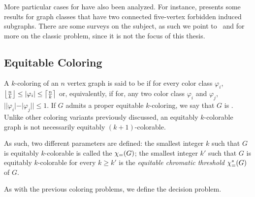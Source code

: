 More particular cases for  have also been analyzed. For instance, \citep{coloring_art} presents some results for graph classes that have two connected five-vertex forbidden induced subgraphs. There are some surveys on the subject, as such we point to~\citep{coloring_survey} and \citep{coloring_survey2} for more on the classic  problem, since it is not the focus of this thesis.


\subsection{Equitable Coloring}
A $k$-coloring of an $n$ vertex graph is said to be  if for every color class $\varphi_i$, $\left\lfloor\frac{n}{k}\right\rfloor \leq |\varphi_i| \leq \left\lceil\frac{n}{k}\right\rceil$ or, equivalently, if for, any two color class $\varphi_i$ and $\varphi_j$, $||\varphi_i| - |\varphi_j|| \leq 1$.
If $G$ admits a proper equitable $k$-coloring, we say that $G$ is .
Unlike other coloring variants previously discussed, an equitably $k$-colorable graph is not necessarily equitably $(k+1)$-colorable.

As such, two different parameters are defined: the smallest integer $k$ such that $G$ is equitably $k$-colorable is called the  $\chi_{\mathcal{=}}(G)$; the smallest integer $k'$ such that $G$ is equitably $k$-colorable for every $k \geq k'$ is the \textit{equitable chromatic threshold} $\chi_{\mathcal{=}}^*(G)$ of $G$.

As with the previous coloring problems, we define the  decision problem.




